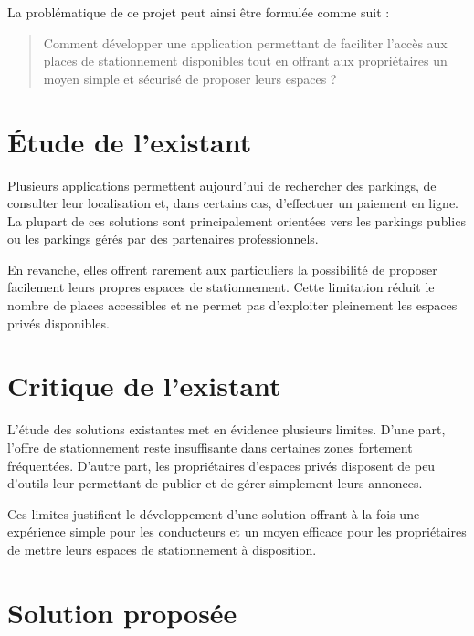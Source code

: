 \par La problématique de ce projet peut ainsi être formulée comme suit :

\begin{quote}
Comment développer une application permettant de faciliter l'accès aux places de stationnement disponibles tout en offrant aux propriétaires un moyen simple et sécurisé de proposer leurs espaces ?
\end{quote}

\section{Étude de l'existant}

\par Plusieurs applications permettent aujourd'hui de rechercher des parkings, de consulter leur localisation et, dans certains cas, d'effectuer un paiement en ligne. La plupart de ces solutions sont principalement orientées vers les parkings publics ou les parkings gérés par des partenaires professionnels.

\par En revanche, elles offrent rarement aux particuliers la possibilité de proposer facilement leurs propres espaces de stationnement. Cette limitation réduit le nombre de places accessibles et ne permet pas d'exploiter pleinement les espaces privés disponibles.

\section{Critique de l'existant}

\par L'étude des solutions existantes met en évidence plusieurs limites. D'une part, l'offre de stationnement reste insuffisante dans certaines zones fortement fréquentées. D'autre part, les propriétaires d'espaces privés disposent de peu d'outils leur permettant de publier et de gérer simplement leurs annonces.

\par Ces limites justifient le développement d'une solution offrant à la fois une expérience simple pour les conducteurs et un moyen efficace pour les propriétaires de mettre leurs espaces de stationnement à disposition.

\section{Solution proposée}

